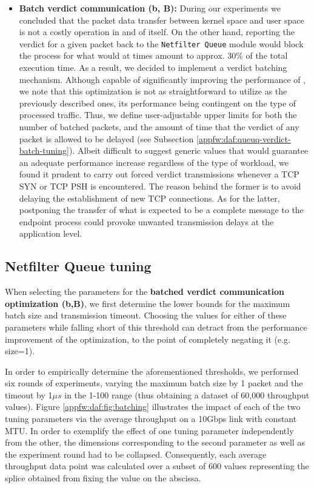 \begin{itemize}
    \item \textbf{Batch verdict communication (b, B):} During our experiments we concluded that the packet data transfer between kernel space and user space is not a costly operation in and of itself. On the other hand, reporting the verdict for a given packet back to the \texttt{Netfilter Queue} module would block the process for what would at times amount to approx. 30\% of the total execution time. As a result, we decided to implement a verdict batching mechanism. Although capable of significantly improving the performance of \daf{}, we note that this optimization is not as straightforward to utilize as the previously described ones, its performance being contingent on the type of processed traffic. Thus, we define user-adjustable upper limits for both the number of batched packets, and the amount of time that the verdict of any packet is allowed to be delayed (see Subsection \ref{appfw:daf:queuq-verdict-batch-tuning}). Albeit difficult to suggest generic values that would guarantee an adequate performance increase regardless of the type of workload, we found it prudent to carry out forced verdict transmissions whenever a TCP SYN or TCP PSH is encountered. The reason behind the former is to avoid delaying the establishment of new TCP connections. As for the latter, postponing the transfer of what is expected to be a complete message to the endpoint process could provoke unwanted transmission delays at the application level.
\end{itemize}

\subsection{Netfilter Queue tuning}

When selecting the parameters for the \textbf{batched verdict communication optimization (b,B)}, we first determine the lower bounds for the maximum batch size and transmission timeout. Choosing the values for either of these parameters while falling short of this threshold can detract from the performance improvement of the optimization, to the point of completely negating it (e.g. size=1).



In order to empirically determine the aforementioned thresholds, we performed six rounds of experiments, varying the maximum batch size by 1 packet and the timeout by 1$\mu{}s$ in the 1-100 range (thus obtaining a dataset of 60,000 throughput values). Figure \ref{appfw:daf:fig:batching} illustrates the impact of each of the two tuning parameters via the average throughput on a 10Gbps link with constant MTU. In order to exemplify the effect of one tuning parameter independently from the other, the dimensions corresponding to the second parameter as well as the experiment round had to be collapsed. Consequently, each average throughput data point was calculated over a subset of 600 values representing the splice obtained from fixing the value on the abscissa.

